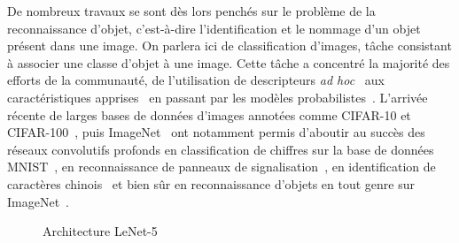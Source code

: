 De nombreux travaux se sont dès lors penchés sur le problème de la reconnaissance d'objet, c'est-à-dire l'identification et le nommage d'un objet présent dans une image. On parlera ici de classification d'images, tâche consistant à associer une classe d'objet à une image. Cette tâche a concentré la majorité des efforts de la communauté, de l'utilisation de descripteurs \emph{ad hoc}~\cite{ullman_aligning_1989} aux caractéristiques apprises~\cite{vidal-naquet_object_2003} en passant par les modèles probabilistes~\cite{schneiderman_probabilistic_1998}. L'arrivée récente de larges bases de données d'images annotées comme CIFAR-10 et CIFAR-100~\cite{krizhevsky_learning_2009}, puis ImageNet~\cite{deng_imagenet_2009,russakovsky_imagenet_2015} ont notamment permis d'aboutir au succès des réseaux convolutifs profonds en classification de chiffres sur la base de données MNIST~\cite{lecun_gradient-based_1998}, en reconnaissance de panneaux de signalisation~\cite{stallkamp_german_2011}, en identification de caractères chinois~\cite{liu_icdar_2011} et bien sûr en reconnaissance d'objets en tout genre sur ImageNet~\cite{krizhevsky_imagenet_2012}.

\begin{figure}[t]
  \resizebox{\textwidth}{!}{
    
  }
  \caption{Architecture LeNet-5~\cite{lecun_gradient-based_1998}}
  \label{fig:lenet}
\end{figure}

